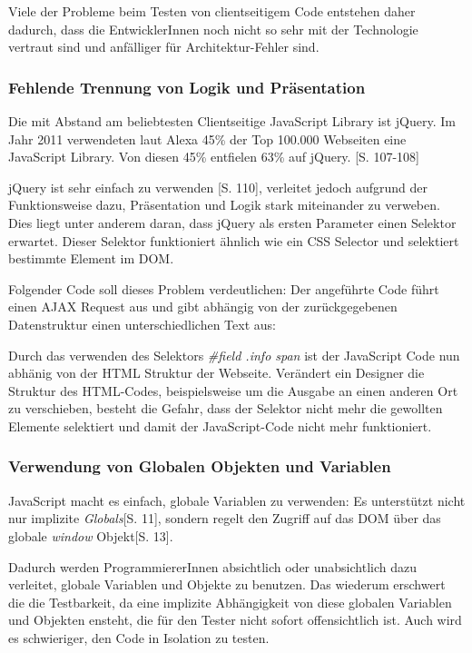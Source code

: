 \documentclass[a4paper,bibtotoc,oneside]{scrbook}
\begin{document}
Viele der Probleme beim Testen von clientseitigem Code entstehen daher dadurch, dass die EntwicklerInnen noch nicht so sehr mit der Technologie vertraut sind und anfälliger für Architektur-Fehler sind.

\subsubsection{Fehlende Trennung von Logik und Präsentation}
Die mit Abstand am beliebtesten Clientseitige JavaScript Library ist jQuery. Im Jahr 2011 verwendeten laut Alexa 45\% der Top 100.000 Webseiten eine JavaScript Library. Von diesen 45\% entfielen 63\% auf jQuery. \cite{jquery}[S. 107-108]

jQuery ist sehr einfach zu verwenden \cite{jquery}[S. 110], verleitet jedoch aufgrund der Funktionsweise dazu, Präsentation und Logik stark miteinander zu verweben. Dies liegt unter anderem daran, dass jQuery als ersten Parameter einen Selektor erwartet. Dieser Selektor funktioniert ähnlich wie ein CSS Selector und selektiert bestimmte Element im DOM. \cite{jquery_selectors}

Folgender Code soll dieses Problem verdeutlichen: Der angeführte Code führt einen AJAX Request aus und gibt abhängig von der zurückgegebenen Datenstruktur einen unterschiedlichen Text aus:




Durch das verwenden des Selektors \emph{\#field .info span} ist der JavaScript Code nun abhänig von der HTML Struktur der Webseite. Verändert ein Designer  die Struktur des HTML-Codes, beispielsweise um die Ausgabe an einen anderen Ort zu verschieben, besteht die Gefahr, dass der Selektor nicht mehr die gewollten Elemente selektiert und damit der JavaScript-Code nicht mehr funktioniert.

\subsubsection{Verwendung von Globalen Objekten und Variablen}
JavaScript macht es einfach, globale Variablen zu verwenden: Es unterstützt nicht nur implizite \emph{Globals}\cite{js_patterns}[S. 11], sondern regelt den Zugriff auf das DOM über das globale \emph{window} Objekt\cite{js_patterns}[S. 13].

Dadurch werden ProgrammiererInnen absichtlich oder unabsichtlich dazu verleitet, globale Variablen und Objekte zu benutzen. Das wiederum erschwert die die Testbarkeit, da eine implizite Abhängigkeit von diese globalen Variablen und Objekten ensteht, die für den Tester nicht sofort offensichtlich ist. Auch wird es schwieriger, den Code in Isolation zu testen.
\end{document}
